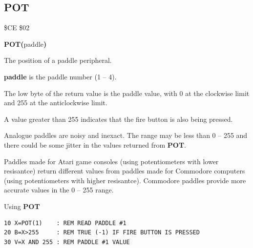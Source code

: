 \subsection{POT}
\begin{description}[leftmargin=2cm,style=nextline]
\item [Token:]    \$CE \$02

\item [Format:]   {\bf POT(}paddle{\bf)}

\item [Returns:]  The position of a paddle peripheral.

                  {\bf paddle} is the paddle number (1 -- 4).

                  The low byte of the return value is the paddle value, with 0 at the clockwise limit and 255 at the anticlockwise limit.

                  A value greater than 255 indicates that the fire button is also being pressed.

\item [Remarks:]  Analogue paddles are noisy and inexact. The range may be less than 0 -- 255 and there could be some jitter in the values returned from {\bf POT}.

                  Paddles made for Atari game consoles (using potentiometers with lower resisantce) return different values from paddles made for Commodore computers (using potentiometers with higher resisantce). Commodore paddles provide more accurate values in the 0 -- 255 range.

\item [Example:]  Using {\bf POT}

\begin{tcolorbox}[colback=black,coltext=white]
\verbatimfont{\codefont}
\begin{verbatim}
10 X=POT(1)    : REM READ PADDLE #1
20 B=X>255     : REM TRUE (-1) IF FIRE BUTTON IS PRESSED
30 V=X AND 255 : REM PADDLE #1 VALUE
\end{verbatim}
\end{tcolorbox}
\end{description}


\newpage
